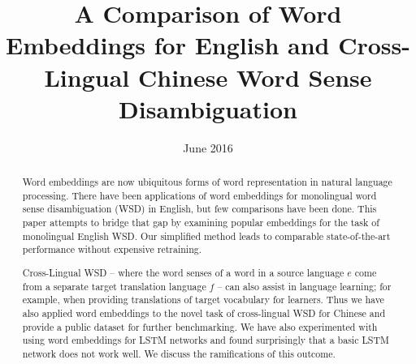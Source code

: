 \documentclass[11pt]{article}
\title{A Comparison of Word Embeddings for English and Cross-Lingual Chinese Word Sense Disambiguation}
\date{June 2016}
\begin{document}
\maketitle
  

\begin{abstract}
Word embeddings are now ubiquitous forms of word representation in
natural language processing.  There have been applications of 
word embeddings for monolingual word sense disambiguation (WSD) in English,
but few comparisons have been done.  This paper attempts to bridge
that gap by examining popular embeddings for the task of monolingual
English WSD.  Our simplified method leads to comparable
state-of-the-art performance without expensive retraining.

Cross-Lingual WSD -- where the word senses of a word in a source
language $e$ come from a separate target translation language $f$ --
can also assist in language learning; for example, when providing
translations of target vocabulary for learners.  Thus we have also
applied word embeddings to the novel task of cross-lingual WSD for
Chinese and provide a public dataset for further benchmarking.
We have also experimented with using word embeddings for LSTM networks
and found surprisingly that a basic LSTM network does not work well.
We discuss the ramifications of this outcome.
\end{abstract}









\end{document}
